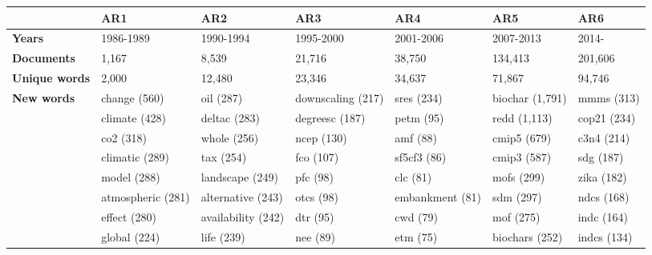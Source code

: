\begin{tabular}{|l |p{1.8cm} p{1.8cm} p{1.8cm} p{1.8cm} p{1.8cm} p{1.8cm}|} 
\hline 
&\textbf{AR1} & \textbf{AR2} & \textbf{AR3} & \textbf{AR4} & \textbf{AR5} & \textbf{AR6}\\ \hline\textbf{Years} &1986-1989 & 1990-1994 & 1995-2000 & 2001-2006 & 2007-2013 & 2014-\\ 
\textbf{Documents} &1,167 & 8,539 & 21,716 & 38,750 & 134,413 & 201,606\\ 
\textbf{Unique words} &2,000 & 12,480 & 23,346 & 34,637 & 71,867 & 94,746\\ 
\textbf{New words} & change (560) & oil (287) & downscaling (217) & sres (234) & biochar (1,791) & mmms (313)\\ & climate (428) & deltac (283) & degreesc (187) & petm (95) & redd (1,113) & cop21 (234)\\ & co2 (318) & whole (256) & ncep (130) & amf (88) & cmip5 (679) & c3n4 (214)\\ & climatic (289) & tax (254) & fco (107) & sf5cf3 (86) & cmip3 (587) & sdg (187)\\ & model (288) & landscape (249) & pfc (98) & clc (81) & mofs (299) & zika (182)\\ & atmospheric (281) & alternative (243) & otcs (98) & embankment (81) & sdm (297) & ndcs (168)\\ & effect (280) & availability (242) & dtr (95) & cwd (79) & mof (275) & indc (164)\\ & global (224) & life (239) & nee (89) & etm (75) & biochars (252) & indcs (134) \\ \hline
\end{tabular}